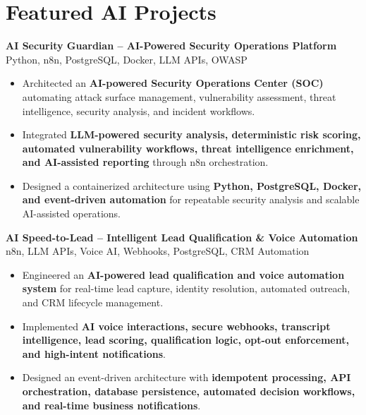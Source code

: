 \documentclass[a4paper,11pt]{article}
\newcommand{\resumeItem}[1]{
    \item \small{#1 \vspace{-2pt}}
}
\newcommand{\resumeProject}[2]{
    \vspace{2pt}
    \textbf{#1} \hfill {\small #2}
    \vspace{2pt}
}
\begin{document}
\section{Featured AI Projects}

\resumeProject
{AI Security Guardian -- AI-Powered Security Operations Platform}
{Python, n8n, PostgreSQL, Docker, LLM APIs, OWASP}

\begin{itemize}[leftmargin=*]

\resumeItem{Architected an \textbf{AI-powered Security Operations Center (SOC)} automating attack surface management, vulnerability assessment, threat intelligence, security analysis, and incident workflows.}

\resumeItem{Integrated \textbf{LLM-powered security analysis, deterministic risk scoring, automated vulnerability workflows, threat intelligence enrichment, and AI-assisted reporting} through n8n orchestration.}

\resumeItem{Designed a containerized architecture using \textbf{Python, PostgreSQL, Docker, and event-driven automation} for repeatable security analysis and scalable AI-assisted operations.}

\end{itemize}

\vspace{1mm}

\resumeProject
{AI Speed-to-Lead -- Intelligent Lead Qualification \& Voice Automation}
{n8n, LLM APIs, Voice AI, Webhooks, PostgreSQL, CRM Automation}

\begin{itemize}[leftmargin=*]

\resumeItem{Engineered an \textbf{AI-powered lead qualification and voice automation system} for real-time lead capture, identity resolution, automated outreach, and CRM lifecycle management.}

\resumeItem{Implemented \textbf{AI voice interactions, secure webhooks, transcript intelligence, lead scoring, qualification logic, opt-out enforcement, and high-intent notifications}.}

\resumeItem{Designed an event-driven architecture with \textbf{idempotent processing, API orchestration, database persistence, automated decision workflows, and real-time business notifications}.}

\end{itemize}

\vspace{1mm}
\end{document}
